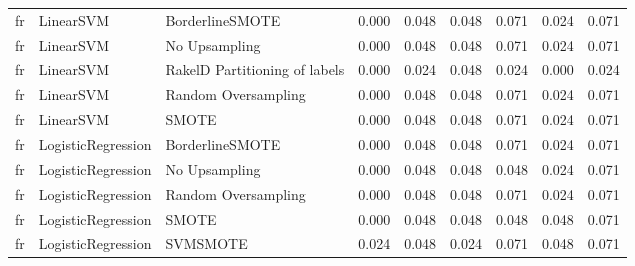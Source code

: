\begin{tabular}{lllllllll}
      fr &                       LinearSVM &               BorderlineSMOTE &     0.000 &                     0.048 &                 0.048 &                  0.071 &                                   0.024 &     0.071 \\
      fr &                       LinearSVM &                 No Upsampling &     0.000 &                     0.048 &                 0.048 &                  0.071 &                                   0.024 &     0.071 \\
      fr &                       LinearSVM & RakelD Partitioning of labels &     0.000 &                     0.024 &                 0.048 &                  0.024 &                                   0.000 &     0.024 \\
      fr &                       LinearSVM &           Random Oversampling &     0.000 &                     0.048 &                 0.048 &                  0.071 &                                   0.024 &     0.071 \\
      fr &                       LinearSVM &                         SMOTE &     0.000 &                     0.048 &                 0.048 &                  0.071 &                                   0.024 &     0.071 \\
      fr &              LogisticRegression &               BorderlineSMOTE &     0.000 &                     0.048 &                 0.048 &                  0.071 &                                   0.024 &     0.071 \\
      fr &              LogisticRegression &                 No Upsampling &     0.000 &                     0.048 &                 0.048 &                  0.048 &                                   0.024 &     0.071 \\
      fr &              LogisticRegression &           Random Oversampling &     0.000 &                     0.048 &                 0.048 &                  0.071 &                                   0.024 &     0.071 \\
      fr &              LogisticRegression &                         SMOTE &     0.000 &                     0.048 &                 0.048 &                  0.048 &                                   0.048 &     0.071 \\
      fr &              LogisticRegression &                      SVMSMOTE &     0.024 &                     0.048 &                 0.024 &                  0.071 &                                   0.048 &     0.071 \\

\end{tabular}
